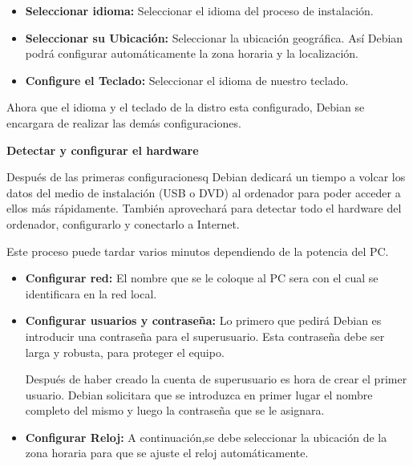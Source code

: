 				\vspace{0.2cm}
	 
				\begin{itemize}
				
					\item \textbf{Seleccionar idioma:} Seleccionar el idioma del proceso de instalación.
					
					\item \textbf{Seleccionar su Ubicación:} Seleccionar la ubicación geográfica. Así Debian podrá configurar automáticamente la zona horaria y la 	localización.	
				
					\item \textbf{Configure el Teclado:} Seleccionar el idioma de nuestro teclado.
							
				\end{itemize}
		
				\vspace{0.2cm}	
			
				Ahora que el idioma y el teclado de la distro esta configurado, Debian se encargara de realizar las demás configuraciones.
			
				\vspace{0.2cm}
			
				\textbf{Detectar y configurar el hardware}\par\vspace{0.2cm}
			
				Después de las primeras configuracionesq Debian dedicará un tiempo a volcar los datos del medio de instalación (USB o DVD) al ordenador para poder acceder a ellos más rápidamente. También aprovechará para detectar todo el hardware del ordenador, configurarlo y conectarlo a Internet.\par
				
				Este proceso puede tardar varios minutos dependiendo de la potencia del PC.\par
			
				\vspace{0.2cm}
			
				\begin{itemize}
					
					\item \textbf{Configurar red:} El nombre que se le coloque al PC sera con el cual se identificara en la red local.
					
					\item \textbf{Configurar usuarios y contraseña:} Lo primero que pedirá Debian es introducir una contraseña para el superusuario. Esta contraseña debe ser larga y robusta, para proteger el equipo.
					
					Después de haber creado la cuenta de superusuario es hora de crear el primer usuario. Debian solicitara que se introduzca en primer lugar el nombre completo del mismo y luego la contraseña que se le asignara.
					
					\item \textbf{Configurar Reloj:} A continuación,se debe seleccionar la ubicación de la zona horaria para que se ajuste el reloj automáticamente.
					
				\end{itemize}

